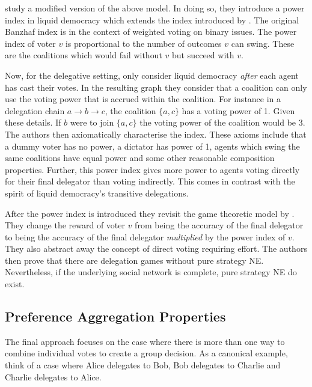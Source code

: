 \documentclass[11pt,a4paper, titlepage]{article}
\theoremstyle{definition}
\begin{document}
\citet{zhang2021power} study a modified version of the above model. In doing so, they introduce a power index in liquid democracy which extends the index introduced by \citet{banzhaf1964weighted}.
The original Banzhaf index is in the context of weighted voting on binary issues.
The power index of voter $v$ is proportional to the number of outcomes $v$ can swing.
These are the coalitions which would fail without $v$ but succeed with $v$.

Now, for the delegative setting, \citeauthor{zhang2021power} only consider liquid democracy \emph{after} each agent has cast their votes.
In the resulting graph they consider that a coalition can only use the voting power that is accrued within the coalition. 
For instance in a delegation chain $a \to b \to c$, the coalition $\{a, c\}$ has a voting power of 1.
Given these details. If $b$ were to join $\{a, c\}$ the voting power of the coalition would be 3.
The authors then axiomatically characterise the index. These axioms include that a dummy voter has no power, a dictator has power of 1, agents which swing the same coalitions have equal power and some other reasonable composition properties.
Further, this power index gives more power to agents voting directly for their final delegator than voting indirectly.
This comes in contrast with the spirit of liquid democracy's transitive delegations.

After the power index is introduced they revisit the game theoretic model by \citet{bloembergen2019rational}.
They change the reward of voter $v$ from being the accuracy of the final delegator to being the accuracy of the final delegator \emph{multiplied} by the power index of $v$.
They also abstract away the concept of direct voting requiring effort.
The authors then prove that there are delegation games without pure strategy NE.
Nevertheless, if the underlying social network is complete, pure strategy NE do exist.

\subsection{Preference Aggregation Properties}
The final approach focuses on the case where there is more than one way to combine individual votes to create a group decision. 
As a canonical example, think of a case where Alice delegates to Bob, Bob delegates to Charlie and Charlie delegates to Alice.
\end{document}
